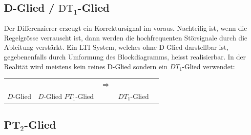 \subsection{D-Glied  / $\text{DT}_1$-Glied}
Der Differenzierer erzeugt ein Korrektursignal im voraus.
Nachteilig ist, wenn die Regelgrösse verrauscht ist, dann werden die hochfrequenten Störsignale durch die Ableitung verstärkt.
Ein LTI-System, welches ohne D-Glied darstellbar ist, gegebenenfalls durch Umformung des Blockdiagramms, heisst realisierbar.
In der Realität wird meistens kein reines D-Glied sondern ein $DT_1$-Glied verwendet:

\begin{tabular}{|l||lll| l}
  \cline{1-4}
	\parbox[c][2cm]{3cm}{} &
	\parbox[c][2cm]{4.5cm}{} &
	$\Rightarrow$ &
	\parbox[c][2cm]{3cm}{} &
	\\
	$D$-Glied &
	$D$-Glied \qquad $PT_1$-Glied & &
	$DT_1$-Glied \\
\end{tabular}

\subsection{PT$_2$-Glied}
